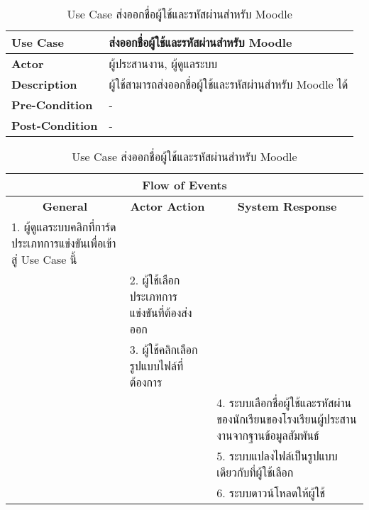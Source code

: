 \begin{table}[H]
    \caption{Use Case ส่งออกชื่อผู้ใช้และรหัสผ่านสำหรับ Moodle}
    \label{tab:usecase-export-moodle-student}
    \begin{tabularx}{\textwidth}{ | p{3cm} | X | }
    \hline
    \textbf{Use Case} & ส่งออกชื่อผู้ใช้และรหัสผ่านสำหรับ Moodle \\
    \hline
    \textbf{Actor} & ผู้ประสานงาน, ผู้ดูแลระบบ \\
    \hline
    \textbf{Description} & ผู้ใช้สามารถส่งออกชื่อผู้ใช้และรหัสผ่านสำหรับ Moodle ได้ \\
    \hline
    \textbf{Pre-Condition} & - \\
    \hline
    \textbf{Post-Condition} & - \\
    \hline
    \end{tabularx}
    \begin{tabularx}{\textwidth}{ | X | X | X | }
    \multicolumn{3}{|c|}{\textbf{Flow of Events}} \\
    \hline
    \multicolumn{1}{|c|}{\textbf{General}} & \multicolumn{1}{|c|}{\textbf{Actor Action}} & \multicolumn{1}{|c|}{\textbf{System Response}} \\
    \hline
    1. ผู้ดูแลระบบคลิกที่การ์ดประเภทการแข่งขันเพื่อเข้าสู่ Use Case นี้ &  &  \\
    \hline
    & 2. ผู้ใช้เลือกประเภทการแข่งขันที่ต้องส่งออก  &  \\
    \hline
    & 3. ผู้ใช้คลิกเลือกรูปแบบไฟล์ที่ต้องการ  &  \\
    \hline
    & & 4. ระบบเลือกชื่อผู้ใช้และรหัสผ่านของนักเรียนของโรงเรียนผู้ประสานงานจากฐานข้อมูลสัมพันธ์ \\
    \hline
    & & 5. ระบบแปลงไฟล์เป็นรูปแบบเดียวกับที่ผู้ใช้เลือก \\
    \hline
    & & 6. ระบบดาวน์โหลดให้ผู้ใช้ \\
    \hline
    \end{tabularx}
\end{table}
